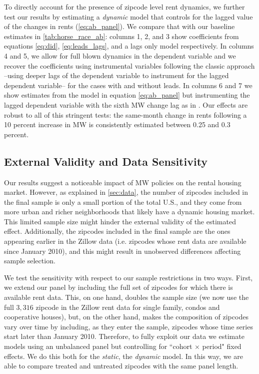To directly account for the presence of zipcode level rent dynamics, we further test our results by 
estimating a \textit{dynamic} model that controls for the lagged value of the changes in rents 
(\autoref{eq:ab_panel}). We compare that with our baseline estimates in 
\autoref{tab:horse_race_ab}: columns 1, 2, and 3 show coefficients from equations \eqref{eq:did}, 
\eqref{eq:leads_lags}, and a lags only model respectively. In columns 4 and 5, we allow for full blown 
dynamics in the dependent variable and we recover the coefficients using instrumental variables 
following the classic \textcite{ArellanoBond1991} approach --using deeper lags of the dependent 
variable to instrument for the lagged dependent variable-- for the cases with and without leads. 
In columns 6 and 7 we show estimates from the model in equation \ref{eq:ab_panel} but instrumenting 
the lagged dependent variable with the sixth MW change lag as in \textcite{MeerWest2016}. Our 
effects are robust to all of this stringent tests: the same-month change in rents following a 10 
percent increase in MW is consistently estimated between 0.25 and 0.3 percent. 

\subsection{External Validity and Data Sensitivity}\label{sec:sample_rest}

Our results suggest a noticeable impact of MW policies on the rental housing market. However, as 
explained in \autoref{sec:data}, the number of zipcodes included in the final sample is only a 
small portion of the total U.S., and they come from more urban and richer neighborhoods that likely 
have a dynamic housing market. This limited sample size might hinder the external validity of the 
estimated effect. Additionally, the zipcodes included in the final sample are the ones appearing 
earlier in the Zillow data (i.e. zipcodes whose rent data are available since January 2010), and 
this might result in unobserved differences affecting sample selection.

We test the sensitivity with respect to our sample restrictions in two ways. First, we extend our 
panel by including the full set of zipcodes for which there is available rent data. This, on one 
hand, doubles the sample size (we now use the full $3,316$ zipcode in the Zillow rent data for 
single family, condos and cooperative houses), but, on the other hand, makes the composition of 
zipcodes vary over time by including, as they enter the sample, zipcodes whose time series start 
later than January 2010. Therefore, to fully exploit our data we estimate models using an unbalanced 
panel but controlling for ``cohort $\times$ period" fixed effects. We do this both for the \textit{static}, 
the \textit{dynamic} model. In this way, 
we are able to compare treated and untreated zipcodes with the same panel length.

